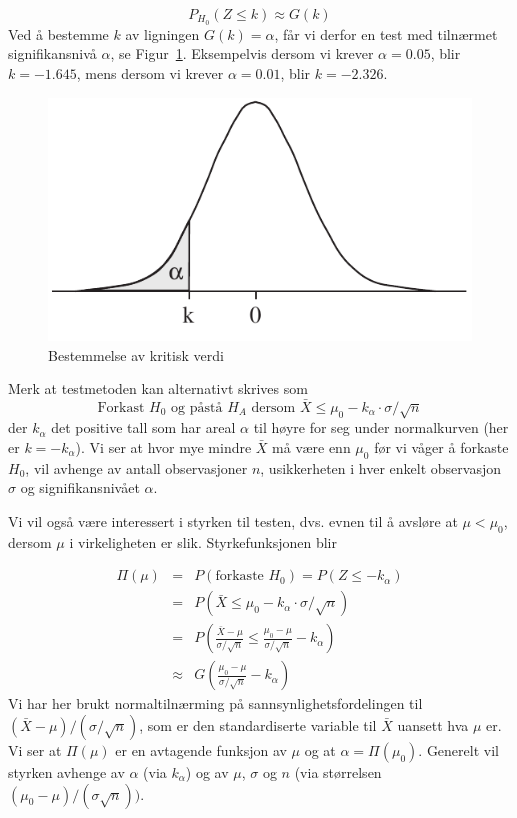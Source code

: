 \[      P_{H_0}(Z\le k)\approx G(k)\]
Ved å bestemme $k$ av ligningen $G(k)=\alpha$, får vi
derfor en test med tilnærmet signifikansnivå $\alpha$, se Figur~\ref{fig:kritisk_verdi}.
Eksempelvis dersom vi krever $\alpha=0.05$, blir $k={-1.645}$,
mens dersom vi krever $\alpha =0.01$, blir $k=-2.326$.

\begin{figure}[ht]
\centering
	\includegraphics[scale=1.0]{figurer/fig8_1.pdf} 
 \caption{Bestemmelse av kritisk verdi}
	\label{fig:kritisk_verdi}
\end{figure}
\noindent Merk at testmetoden kan alternativt skrives som 
\[  \mbox{Forkast $H_0$ og påstå $H_A$ dersom $\bar X\le 
                          {\mu}_0 - k_{\alpha} \cdot \sigma /\sqrt n$} \]
der $k_{\alpha}$ det  positive tall som har areal $\alpha$ til høyre for seg
under normalkurven (her er $k=-k_{\alpha}$). Vi ser at hvor mye mindre $\bar X$ må være enn
${\mu}_0$ før vi våger å forkaste $H_0$,
vil avhenge av antall observasjoner $n$, usikkerheten i hver
enkelt observasjon $\sigma$ og signifikansnivået $\alpha$.

Vi vil også være interessert i styrken til testen,
dvs. evnen til å avsløre at $\mu < {\mu}_0$, dersom $\mu$ i
virkeligheten er slik. Styrkefunksjonen blir 

\begin{eqnarray*}
\Pi (\mu )&=&P(\mbox{forkaste $H_0$})=P(Z\le -k_{\alpha})\\
          &=&P(\bar X \le {\mu}_0 - k_{\alpha}\cdot \sigma /\sqrt {n})\\
          &=&P(\frac{\bar X - \mu}{\sigma /\sqrt{n}} \le
          \frac{{\mu}_0 - \mu}{\sigma /\sqrt{n}}-k_{\alpha})\\
  &\approx& G(\frac{{\mu}_0 - \mu}{\sigma /\sqrt{n}}-k_{\alpha})
\end{eqnarray*}
Vi har her brukt normaltilnærming på sannsynlighetsfordelingen til \\
$(\bar X - \mu)/(\sigma /\sqrt{ n})$,
som er den standardiserte variable til $\bar X$ uansett hva $\mu$ er.
Vi ser at $\Pi (\mu )$ er en avtagende funksjon av $\mu$
og at $\alpha =\Pi ({\mu}_0)$. Generelt vil styrken
avhenge av $\alpha$ (via $k_{\alpha}$) og av $\mu$, $\sigma$ og $n$ (via
størrelsen $({\mu}_0-\mu )/(\sigma \sqrt {n}))$.

